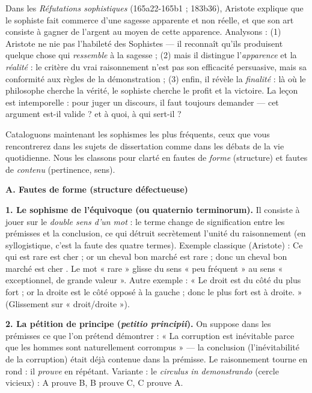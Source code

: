 \documentclass[11pt]{article}
\newcounter{popsec}
\newcounter{popsub}
\newcommand{\courssub}[1]{%
  \stepcounter{popsub}%
  \par\vspace{9pt}\noindent{\popxbold\fontsize{11.5}{13}\selectfont\color{popink}{\color{poporange}\thepopsec.\thepopsub}\hspace{6pt}#1}\par\nopagebreak\vspace{4pt}
}
\begin{document}
\begin{experience}
Dans les \emph{Réfutations sophistiques} (165a22-165b1 ; 183b36), Aristote explique que le sophiste fait commerce d'une sagesse apparente et non réelle, et que son art consiste à gagner de l'argent au moyen de cette apparence. Analysons : (1) Aristote ne nie pas l'habileté des Sophistes — il reconnaît qu'ils produisent quelque chose qui \emph{ressemble} à la sagesse ; (2) mais il distingue l'\emph{apparence} et la \emph{réalité} : le critère du vrai raisonnement n'est pas son efficacité persuasive, mais sa conformité aux règles de la démonstration ; (3) enfin, il révèle la \emph{finalité} : là où le philosophe cherche la vérité, le sophiste cherche le profit et la victoire. La leçon est intemporelle : pour juger un discours, il faut toujours demander — cet argument est-il valide ? et à quoi, à qui sert-il ?
\end{experience}

\courssub{Les grands procédés fallacieux : un répertoire}

Cataloguons maintenant les sophismes les plus fréquents, ceux que vous rencontrerez dans les sujets de dissertation comme dans les débats de la vie quotidienne. Nous les classons pour clarté en fautes de \emph{forme} (structure) et fautes de \emph{contenu} (pertinence, sens).

\textbf{A. Fautes de forme (structure défectueuse)}

\textbf{1. Le sophisme de l'équivoque (ou quaternio terminorum).} Il consiste à jouer sur le \emph{double sens d'un mot} : le terme change de signification entre les prémisses et la conclusion, ce qui détruit secrètement l'unité du raisonnement (en syllogistique, c'est la faute des quatre termes). Exemple classique (Aristote) : \guillemotleft Ce qui est rare est cher ; or un cheval bon marché est rare ; donc un cheval bon marché est cher \guillemotright. Le mot « rare » glisse du sens « peu fréquent » au sens « exceptionnel, de grande valeur ». Autre exemple : « Le droit est du côté du plus fort ; or la droite est le côté opposé à la gauche ; donc le plus fort est à droite. » (Glissement sur « droit/droite »).

\textbf{2. La pétition de principe (\emph{petitio principii}).} On suppose dans les prémisses ce que l'on prétend démontrer : « La corruption est inévitable parce que les hommes sont naturellement corrompus » — la conclusion (l'inévitabilité de la corruption) était déjà contenue dans la prémisse. Le raisonnement tourne en rond : il \emph{prouve} en répétant. Variante : le \emph{circulus in demonstrando} (cercle vicieux) : A prouve B, B prouve C, C prouve A.
\end{document}
